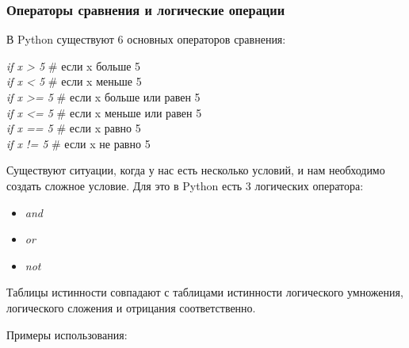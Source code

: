 \subsubsection*{Операторы сравнения и логические операции}

В Python существуют 6 основных операторов сравнения:

\begin{flushleft}
	\colorbox[rgb]{0.95, 0.95, 0.95}{\textit{if x > 5} \hspace{1cm} \# если x больше 5} \\
	\colorbox[rgb]{0.95, 0.95, 0.95}{\textit{if x < 5} \hspace{1cm} \# если x меньше 5} \\
	\colorbox[rgb]{0.95, 0.95, 0.95}{\textit{if x >= 5} \hspace{0.7cm} \# если x больше или равен 5} \\
	\colorbox[rgb]{0.95, 0.95, 0.95}{\textit{if x <= 5} \hspace{0.7cm} \# если x меньше или равен 5} \\
	\colorbox[rgb]{0.95, 0.95, 0.95}{\textit{if x == 5} \hspace{0.7cm} \# если x равно 5} \\
	\colorbox[rgb]{0.95, 0.95, 0.95}{\textit{if x != 5} \hspace{0.9cm} \# если x не равно 5} \\
\end{flushleft}

Существуют ситуации, когда у нас есть несколько условий, и нам необходимо создать сложное условие. Для это в Python есть 3 логических оператора:

\begin{itemize}
	\setlength\itemsep{0.1em}
	\item \textit{and}
	\item \textit{or}
	\item \textit{not}
\end{itemize}

Таблицы истинности совпадают с таблицами истинности логического умножения, логического сложения и отрицания соответственно.

Примеры использования:

